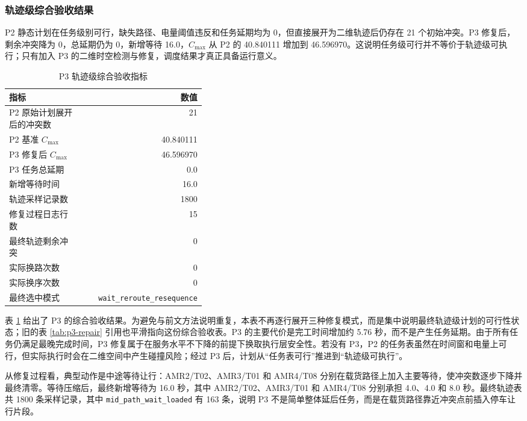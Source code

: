 \subsubsection{轨迹级综合验收结果}

P2 静态计划在任务级别可行，缺失路径、电量阈值违反和任务延期均为 0，但直接展开为二维轨迹后仍存在 21 个初始冲突。P3 修复后，剩余冲突降为 0，总延期仍为 0，新增等待 16.0，$C_{\max}$ 从 P2 的 40.840111 增加到 46.596970。这说明任务级可行并不等价于轨迹级可执行；只有加入 P3 的二维时空检测与修复，调度结果才真正具备运行意义。

\begin{table}[H]
\centering
\small
\begin{tabular}{p{0.38\linewidth}r}
\toprule
指标 & 数值 \\
\midrule
P2 原始计划展开后的冲突数 & 21 \\
P2 基准 $C_{\max}$ & 40.840111 \\
P3 修复后 $C_{\max}$ & 46.596970 \\
P3 任务总延期 & 0.0 \\
新增等待时间 & 16.0 \\
轨迹采样记录数 & 1800 \\
修复过程日志行数 & 15 \\
最终轨迹剩余冲突 & 0 \\
实际换路次数 & 0 \\
实际换序次数 & 0 \\
最终选中模式 & \verb|wait_reroute_resequence| \\
\bottomrule
\end{tabular}
\caption{P3 轨迹级综合验收指标}
\label{tab:p3-repair}
\label{tab:p3-experiment-summary}
\end{table}

表 \ref{tab:p3-experiment-summary} 给出了 P3 的综合验收结果。为避免与前文方法说明重复，本表不再逐行展开三种修复模式，而是集中说明最终轨迹级计划的可行性状态；旧的表 \ref{tab:p3-repair} 引用也平滑指向这份综合验收表。P3 的主要代价是完工时间增加约 5.76 秒，而不是产生任务延期。由于所有任务仍满足最晚完成时间，P3 修复属于在服务水平不下降的前提下换取执行层安全性。若没有 P3，P2 的任务表虽然在时间窗和电量上可行，但实际执行时会在二维空间中产生碰撞风险；经过 P3 后，计划从“任务表可行”推进到“轨迹级可执行”。

从修复过程看，典型动作是中途等待让行：AMR2/T02、AMR3/T01 和 AMR4/T08 分别在载货路径上加入主要等待，使冲突数逐步下降并最终清零。等待压缩后，最终新增等待为 16.0 秒，其中 AMR2/T02、AMR3/T01 和 AMR4/T08 分别承担 4.0、4.0 和 8.0 秒。最终轨迹表共 1800 条采样记录，其中 \verb|mid_path_wait_loaded| 有 163 条，说明 P3 不是简单整体延后任务，而是在载货路径靠近冲突点前插入停车让行片段。

